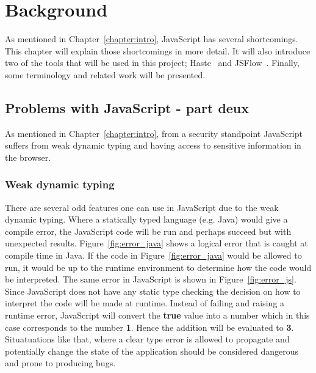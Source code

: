 \chapter{Background}
As mentioned in Chapter~\ref{chapter:intro}, JavaScript has several shortcomings. This chapter will explain those shortcomings in more detail. It will also introduce two of the tools that will be used in this project; Haste~\cite{haste-lang} and JSFlow~\cite{jsflow,jsflow-csf12,jsflow-sac14}. Finally, some terminology and related work will be presented.

\section{Problems with JavaScript - part deux}
As mentioned in Chapter~\ref{chapter:intro}, from a security standpoint JavaScript suffers from weak dynamic typing and having access to sensitive information in the browser.
\subsection{Weak dynamic typing}
\label{chapter:weak-dynamic-typing}
There are several odd features one can use in JavaScript due to the weak dynamic typing. Where a statically typed language (e.g. Java) would give a compile error, the JavaScript code will be run and perhaps succeed but with unexpected results. Figure~\ref{fig:error_java} shows a logical error that is caught at compile time in Java. If the code in Figure~\ref{fig:error_java} would be allowed to run, it would be up to the runtime environment to determine how the code would be interpreted. The same error in JavaScript is shown in Figure~\ref{fig:error_js}. Since JavaScript does not have any static type checking the decision on how to interpret the code will be made at runtime. Instead of failing and raising a runtime error, JavaScript will convert the \textbf{true} value into a number which in this case corresponds to the number \textbf{1}. Hence the addition will be evaluated to \textbf{3}. Situatuations like that, where a clear type error is allowed to propagate and potentially change the state of the application should be considered dangerous and prone to producing bugs.

